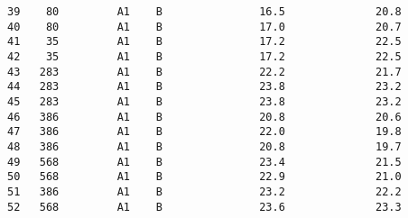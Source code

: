 \documentclass[11pt]{article}
\begin{document}
\begin{Verbatim}[commandchars=\\\{\}]
39    80         A1    B               16.5              20.8   
40    80         A1    B               17.0              20.7   
41    35         A1    B               17.2              22.5   
42    35         A1    B               17.2              22.5   
43   283         A1    B               22.2              21.7   
44   283         A1    B               23.8              23.2   
45   283         A1    B               23.8              23.2   
46   386         A1    B               20.8              20.6   
47   386         A1    B               22.0              19.8   
48   386         A1    B               20.8              19.7   
49   568         A1    B               23.4              21.5   
50   568         A1    B               22.9              21.0   
51   386         A1    B               23.2              22.2   
52   568         A1    B               23.6              23.3   


\end{Verbatim}
\end{document}
